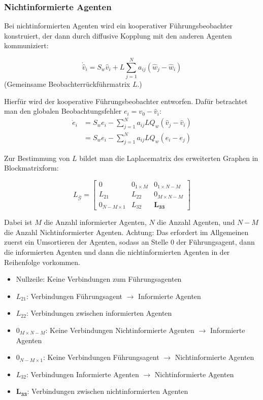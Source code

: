 \subsubsection{Nichtinformierte Agenten}

Bei nichtinformierten Agenten wird ein kooperativer Führungsbeobachter konstruiert,
der dann durch diffusive Kopplung mit den anderen Agenten kommuniziert:

\begin{equation}
    \dot{\hat{v}}_i = S_w \hat{v}_i + L \sum_{j=1}^N a_{ij} (\hat{w}_j - \hat{w}_i)
\end{equation}
(Gemeinsame Beobachterrückführmatrix $L$.)

Hierfür wird der kooperative Führungsbeobachter entworfen.
Dafür betrachtet man den globalen Beobachtungsfehler $e_i = v_0 - \hat{v}_i$:
\begin{align}
    \dot{e}_i &= S_w e_i - \sum_{j=1}^N a_{ij} L Q_w (\hat{v}_j - \hat{v}_i) \\
    &= S_w e_i - \sum_{j=1}^N a_{ij} L Q_w (e_i - e_j)
\end{align}

Zur Bestimmung von $L$ bildet man die Laplacematrix des erweiterten Graphen in Blockmatrixform:

\begin{equation}
    L_{\overbar{\mathcal{G}}} = \begin{bmatrix}
        0 & 0_{1\times M} & 0_{1 \times N-M}\\
        L_{21} & L_{22} & 0_{M \times N-M} \\
        0_{N-M \times 1} & L_{32} & \bm{L_{33}}
    \end{bmatrix}
\end{equation}

Dabei ist $M$ die Anzahl informierter Agenten, $N$ die Anzahl Agenten, und $N-M$ die
Anzahl Nichtinformierter Agenten.
Achtung: Das erfordert im Allgemeinen zuerst ein Umsortieren der Agenten, sodass
an Stelle 0 der Führungsagent, dann die informierten Agenten und dann die
nichtinformierten Agenten in der Reihenfolge vorkommen.

\begin{itemize}
    \item Nullzeile: Keine Verbindungen zum Führungsagenten
    \item $L_{21}$: Verbindungen Führungsagent $\rightarrow$ Informierte Agenten
    \item $L_{22}$: Verbindungen zwischen informierten Agenten
    \item $0_{M \times N-M}$: Keine Verbindungen Nichtinformierte Agenten $\rightarrow$ Informierte Agenten
    \item $0_{N-M \times 1}$: Keine Verbindungen Führungsagent $\rightarrow$ Nichtinformierte Agenten
    \item $L_{32}$: Verbindungen Informierte Agenten $\rightarrow$ Nichtinformierte Agenten
    \item $\bm{L_{33}}$: Verbindungen zwischen nichtinformierten Agenten
\end{itemize}

